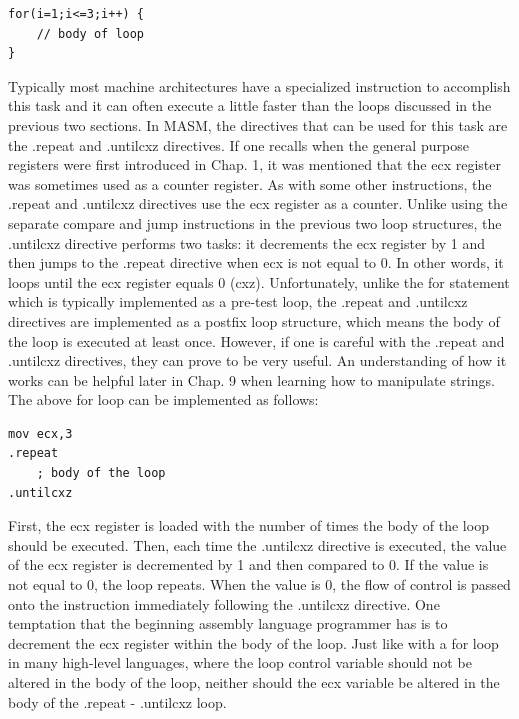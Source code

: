 \documentclass[10pt]{book}
\begin{document}
\begin{verbatim}
for(i=1;i<=3;i++) {
    // body of loop
}
\end{verbatim}

Typically most machine architectures have a specialized instruction to accomplish this task and it can often execute a little faster than the loops discussed in the previous two sections. In MASM, the directives that can be used for this task are the .repeat and .untilcxz directives. If one recalls when the general purpose registers were first introduced in Chap. 1, it was mentioned that the ecx register was sometimes used as a counter register. As with some other instructions, the .repeat and .untilcxz directives use the ecx register as a counter. Unlike using the separate compare and jump instructions in the previous two loop structures, the .untilcxz directive performs two tasks: it decrements the ecx register by 1 and then jumps to the .repeat directive when ecx is not equal to 0. In other words, it loops until the ecx register equals 0 (cxz). Unfortunately, unlike the for statement which is typically implemented as a pre-test loop, the .repeat and .untilcxz directives are implemented as a postfix loop structure, which means the body of the loop is executed at least once. However, if one is careful with the .repeat and .untilcxz directives, they can prove to be very useful. An understanding of how it works can be helpful later in Chap. 9 when learning how to manipulate strings. The above for loop can be implemented as follows:

\begin{verbatim}
mov ecx,3
.repeat
    ; body of the loop
.untilcxz
\end{verbatim}

First, the ecx register is loaded with the number of times the body of the loop should be executed. Then, each time the .untilcxz directive is executed, the value of the ecx register is decremented by 1 and then compared to 0. If the value is not equal to 0, the loop repeats. When the value is 0, the flow of control is passed onto the instruction immediately following the .untilcxz directive.
One temptation that the beginning assembly language programmer has is to decrement the ecx register within the body of the loop. Just like with a for loop in many high-level languages, where the loop control variable should not be altered in the body of the loop, neither should the ecx variable be altered in the body of the .repeat - .untilcxz loop.
\end{document}
